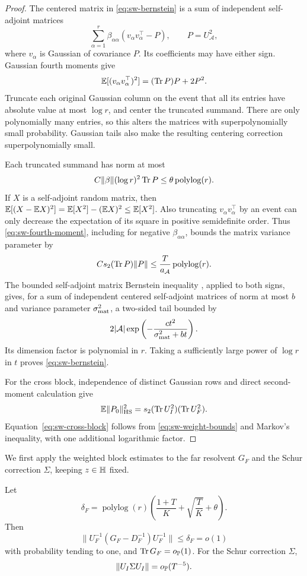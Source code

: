 \begin{proof}
The centered matrix in \eqref{eq:sw-bernstein} is a sum of independent
self-adjoint matrices
\[
 \sum_{\alpha=1}^{r}\beta_{\alpha\alpha}
       (v_\alpha v_\alpha^\top-P),\qquad P=U_{\mathcal A}^2,
\]
where \(v_\alpha\) is Gaussian of covariance \(P\).
Its coefficients may have either sign. Gaussian fourth moments give
\begin{equation}\label{eq:sw-fourth-moment}
 \mathbb E[(v_\alpha v_\alpha^\top)^2]
   =(\operatorname{Tr} P)P+2P^2.
\end{equation}
Truncate each original Gaussian column on the event that all its entries
have absolute value at most \(\log r\), and center the truncated summand.
There are only polynomially many entries, so this alters the matrices with
superpolynomially small probability. Gaussian tails also make the resulting
centering correction superpolynomially small.

Each truncated summand has norm at most
\[
 C\|\beta\|(\log r)^2\operatorname{Tr} P
 \le \theta\operatorname{polylog}(r).
\]
If \(X\) is a self-adjoint random matrix, then
\(\mathbb E[(X-\mathbb E X)^2]=\mathbb E[X^2]-(\mathbb E X)^2\le\mathbb E[X^2]\).
Also truncating \(v_\alpha v_\alpha^\top\) by an event can only decrease
the expectation of its square in positive semidefinite order.
Thus \eqref{eq:sw-fourth-moment}, including for negative
\(\beta_{\alpha\alpha}\), bounds the matrix variance parameter by
\[
 C s_2(\operatorname{Tr} P)\|P\|
 \le \frac{T}{a_{\mathcal A}}\operatorname{polylog}(r).
\]
The bounded self-adjoint matrix Bernstein inequality
\cite[Theorem~1.4]{Tropp2012}, applied to both signs, gives, for a sum of independent centered
self-adjoint matrices of norm at most \(b\) and variance parameter
\(\sigma_{\rm mat}^2\), a two-sided tail bounded by
\[
 2|\mathcal A|\exp\left(
 -\frac{c t^2}{\sigma_{\rm mat}^2+bt}\right).
\]
Its dimension factor is polynomial in \(r\). Taking a sufficiently large
power of \(\log r\) in \(t\) proves \eqref{eq:sw-bernstein}.

For the cross block, independence of distinct Gaussian rows and direct
second-moment calculation give
\[
 \mathbb E\|P_0\|_{\mathrm{HS}}^2
 =s_2(\operatorname{Tr} U_I^2)(\operatorname{Tr} U_F^2).
\]
Equation~\eqref{eq:sw-cross-block} follows from
\eqref{eq:sw-weight-bounds} and Markov's inequality, with one additional
logarithmic factor.
\end{proof}

We first apply the weighted block estimates to the far resolvent
\(G_F\) and the Schur correction \(\Sigma\), keeping \(z\in\mathbb H\) fixed.

\begin{lemma}\label{sw:schur}
Let
\[
 \delta_F=\operatorname{polylog}(r)
       \left(\frac{1+T}{K}+\sqrt{\frac TK}+\theta\right).
\]
Then
\begin{equation}\label{eq:sw-far-resolvent}
 \|U_F^{-1}(G_F-D_F^{-1})U_F^{-1}\|\le\delta_F=o(1)
\end{equation}
with probability tending to one, and \(\operatorname{Tr} G_F=o_{\mathbb P}(1)\).
For the Schur correction \(\Sigma\),
\begin{equation}\label{eq:sw-schur-small}
 \|U_I\Sigma U_I\|=o_{\mathbb P}(T^{-5}).
\end{equation}
\end{lemma}

